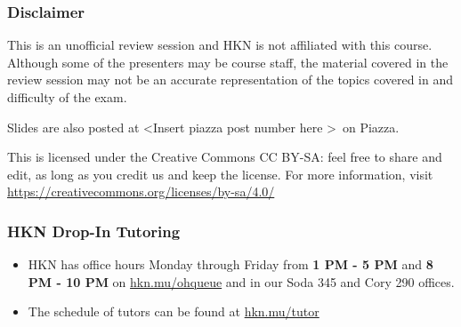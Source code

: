 \providecommand{\SlideAccessingLogistics}{\textless Insert piazza post number here \textgreater}
\providecommand{\SlidesLocation}{\textless Slides location and/or link \textgreater}
\providecommand{\PresenterHours}{\textless Itemize the presenter hours here \textgreater}

\begin{frame}

\titlepage

\end{frame}

\begin{frame}[t]\vspace{20pt}
\frametitle{Disclaimer}
This is an unofficial review session and HKN is not affiliated with this course. Although some of the presenters may be course staff, the material covered in the review session may not be an accurate representation of the topics covered in and difficulty of the exam.


Slides are also posted at \SlideAccessingLogistics\ on Piazza.

\begin{footnotesize}
  This is licensed under the Creative Commons CC BY-SA: feel free to share and edit, as long as you credit us and keep the license. For more information, visit
  \href{https://creativecommons.org/licenses/by-sa/4.0/}{https://creativecommons.org/licenses/by-sa/4.0/}
\end{footnotesize}

\vspace{20pt}

\end{frame}


\begin{frame}[t]\vspace{20pt}
\frametitle{HKN Drop-In Tutoring}

\begin{itemize}
  \item HKN has office hours Monday through Friday from \textbf{1 PM - 5 PM} and \textbf{8 PM - 10 PM} on \href{https://hkn.mu/ohqueue}{hkn.mu/ohqueue} and in our Soda 345 and Cory 290 offices.
  \item The schedule of tutors can be found at \href{https://hkn.mu/tutor}{hkn.mu/tutor}
\end{itemize}

\end{frame}
